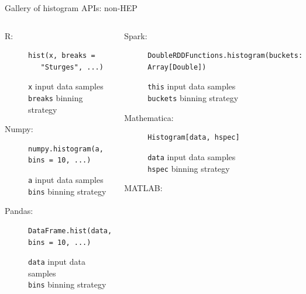 \documentclass[aspectratio=169]{beamer}
\begin{document}
\begin{frame}[fragile]{Gallery of histogram APIs: non-HEP}
\vspace{0.25 cm}
\begin{columns}
\begin{description}
\item[R:]

\begin{lstlisting}
hist(x, breaks =
   "Sturges", ...)
\end{lstlisting}

{\tt x} input data samples \\
{\tt breaks} binning strategy

\item[Numpy:]

\begin{lstlisting}
numpy.histogram(a, bins = 10, ...)
\end{lstlisting}

{\tt a} input data samples \\
{\tt bins} binning strategy

\item[Pandas:]

\begin{lstlisting}
DataFrame.hist(data, bins = 10, ...)
\end{lstlisting}

{\tt data} input data samples \\
{\tt bins} binning strategy
\end{description}

\begin{description}
\item[Spark:]

\begin{lstlisting}
DoubleRDDFunctions.histogram(buckets: Array[Double])
\end{lstlisting}

{\tt this} input data samples \\
{\tt buckets} binning strategy

\item[Mathematica:]

\begin{lstlisting}
Histogram[data, hspec]
\end{lstlisting}

{\tt data} input data samples \\
{\tt hspec} binning strategy

\item[MATLAB:]


\end{description}
\end{columns}
\end{frame}
\end{document}
